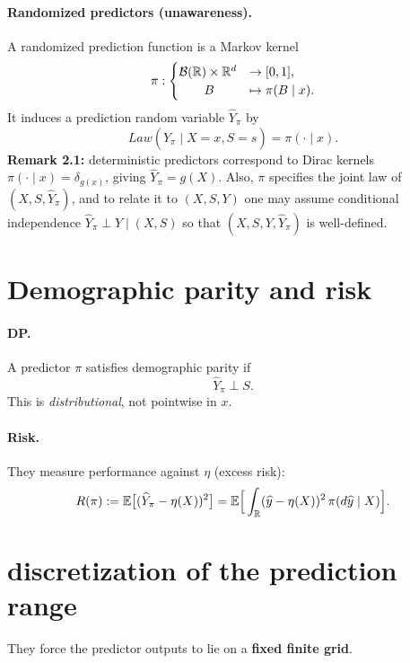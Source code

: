 \documentclass[11pt]{article}
\begin{document}
\paragraph{Randomized predictors (unawareness).}
A randomized prediction function is a Markov kernel
\begin{equation}
\pi: 
\begin{cases}
  \mathcal{B}(\mathbb{R})\times \mathbb{R}^d &\to [0,1],\\
  \qquad B&\mapsto \pi(B\mid x).
\end{cases}
\end{equation}
It induces a prediction random variable $\widehat Y_\pi$ by
\begin{equation}
Law(\widehat Y_\pi \mid X=x, S=s)=\pi(\cdot\mid x).
\end{equation}
\textbf{Remark 2.1:} deterministic predictors correspond to Dirac kernels
$\pi(\cdot\mid x)=\delta_{g(x)}$, giving $\widehat Y_\pi=g(X)$. Also, $\pi$ specifies the joint law
of $(X,S,\widehat Y_\pi)$, and to relate it to $(X,S,Y)$ one may assume conditional independence
$\widehat Y_\pi \perp Y \mid (X,S)$ so that $(X,S,Y,\widehat Y_\pi)$ is well-defined.

\section{Demographic parity and risk}
\paragraph{DP.}
A predictor $\pi$ satisfies demographic parity if
\begin{equation}
\widehat Y_\pi \perp S.
\end{equation}
This is \emph{distributional}, not pointwise in $x$.

\paragraph{Risk.}
They measure performance against $\eta$ (excess risk):
\begin{equation}
R(\pi) := \mathbb{E}\big[(\widehat Y_\pi-\eta(X))^2\big]
        = \mathbb{E}\Big[\int_{\mathbb{R}} (\widehat y-\eta(X))^2\,\pi(d\widehat y\mid X)\Big].
\end{equation}

\section{discretization of the prediction range}
They force the predictor outputs to lie on a \textbf{fixed finite grid}.
\end{document}
